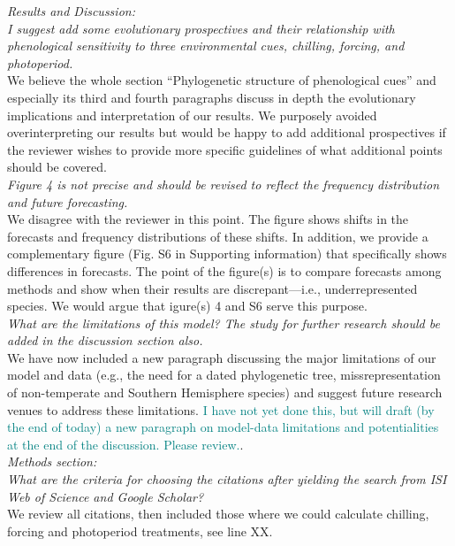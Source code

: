 \documentclass[11pt]{article}
\begin{document}
\emph{Results and Discussion:}\\
\emph{I suggest add some evolutionary prospectives and their relationship with phenological sensitivity to three environmental cues, chilling, forcing, and photoperiod.}\\
We believe the whole section ``Phylogenetic structure of phenological cues'' and especially its third and fourth paragraphs discuss in depth the evolutionary implications and interpretation of our results. We purposely avoided overinterpreting our results but would be happy to add additional prospectives if the reviewer wishes to provide more specific guidelines of what additional points should be covered.\\

\emph{Figure 4 is not precise and should be revised to reflect the frequency distribution and future forecasting.}\\
We disagree with the reviewer in this point. The figure shows shifts in the forecasts and frequency distributions of these shifts. In addition, we provide a complementary figure (Fig. S6 in Supporting information) that specifically shows differences in forecasts. The point of the figure(s) is to compare forecasts among methods and show when their results are discrepant---i.e., underrepresented species. We would argue that igure(s) 4 and S6 serve this purpose.\\


\emph{What are the limitations of this model? The study for further research should be added in the discussion section also.}\\
We have now included a new paragraph discussing the major limitations of our model and data (e.g., the need for a dated phylogenetic tree, missrepresentation of non-temperate and Southern Hemisphere species) and suggest future research venues to address these limitations.
\textcolor{teal}{I have not yet done this, but will draft (by the end of today) a new paragraph on model-data limitations and potentialities at the end of the discussion. Please review.}.\\

\emph{Methods section:}\\
\emph{What are the criteria for choosing the citations after yielding the search from ISI Web of Science and Google Scholar?}\\
We review all citations, then included those where we could calculate chilling, forcing and photoperiod treatments, see line XX. \\
\end{document}
